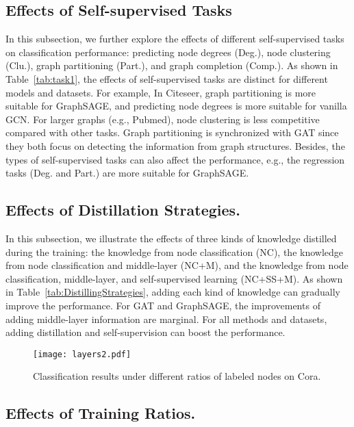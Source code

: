 \documentclass[letterpaper]{article} \usepackage{aaai22} \usepackage{times} \usepackage{helvet} \usepackage{courier} \usepackage[hyphens]{url} \usepackage{graphicx} \urlstyle{rm} \def\UrlFont{\rm} \usepackage{subfigure}
\begin{document}
	\subsection{Effects of Self-supervised Tasks}
	
	In this subsection, we further explore the effects of different self-supervised tasks on classification performance: predicting node degrees (Deg.), node clustering (Clu.), graph partitioning (Part.), and graph completion (Comp.). As shown in Table~\ref{tab:task1}, the effects of self-supervised tasks are distinct for different models and datasets. For example, In Citeseer, graph partitioning is more suitable for GraphSAGE, and predicting node degrees is more suitable for vanilla GCN. For larger graphs (e.g., Pubmed), node clustering is less competitive compared with other tasks. Graph partitioning is synchronized with GAT since they both focus on detecting the information from graph structures. Besides, the types of self-supervised tasks can also affect the performance, e.g., the regression tasks (Deg. and Part.) are more suitable for GraphSAGE. 
	
	\subsection{Effects of Distillation Strategies.}
	
	In this subsection, we illustrate the effects of three kinds of knowledge distilled during the training: the knowledge from node classification (NC), the knowledge from node classification and middle-layer (NC+M), and the knowledge from node classification, middle-layer, and self-supervised learning (NC+SS+M). As shown in Table~\ref{tab:DistillingStrategies}, adding each kind of knowledge can gradually improve the performance. For GAT and GraphSAGE, the improvements of adding middle-layer information are marginal. For all methods and datasets, adding distillation and self-supervision can boost the performance.
	
	\begin{figure}[htbp]
		\centering
		\texttt{[image: layers2.pdf]}
		\label{layer2}\hspace{0.1in}
		\caption{Classification results under different ratios of labeled nodes on Cora.}
		\label{fig:layerratio}
	\end{figure}
	
	\subsection{Effects of Training Ratios.}
	
\end{document}
